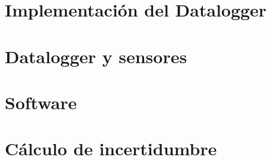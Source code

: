 \documentclass[11pt, a4paper,oneside]{book}
\begin{document}


\clearpage\hbox{}\thispagestyle{empty}\newpage

\clearpage\hbox{}\thispagestyle{empty}\newpage

\clearpage\hbox{}\thispagestyle{empty}\newpage

\clearpage\hbox{}\thispagestyle{empty}\newpage
\tableofcontents
\listoffigures
\listoftables
\newpage

\setcounter{page}{1}

% 
% 
% 
\chapter{Implementación del Datalogger}\label{cap:datalogger}

% 
% 
% 


\appendix
\chapter{Datalogger y sensores}

\chapter{Software}

\chapter{Cálculo de incertidumbre}

\printbibliography
\end{document}
